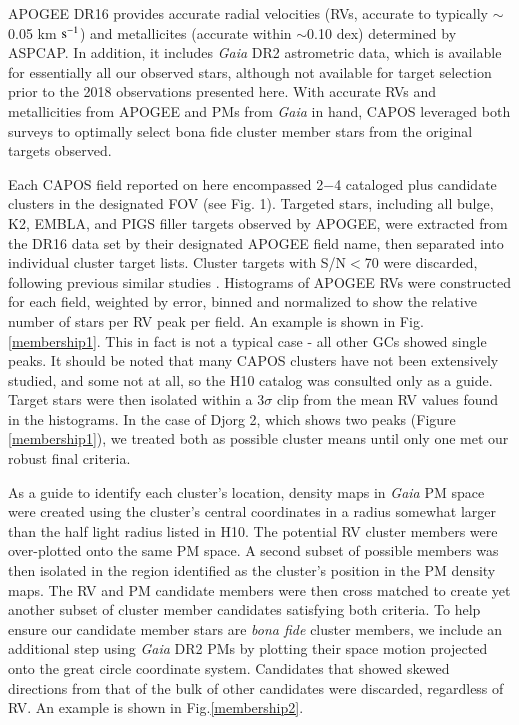 \documentclass[onecolumn]{aa}
\begin{document}
APOGEE DR16 provides accurate radial velocities (RVs, accurate to typically $\sim$0.05 km $\rm s^{-1}$) and metallicites (accurate within $\sim$0.10 dex) determined by ASPCAP.
In addition, it includes {\it Gaia} DR2 astrometric data, which is available for essentially all our observed stars, although not available for target selection prior to the 2018 observations presented here.
With accurate RVs and metallicities from APOGEE and PMs from {\it Gaia} in hand, CAPOS leveraged both surveys to optimally select bona fide cluster member stars from the original targets observed. 

Each CAPOS field reported on here encompassed 2$-$4 cataloged plus candidate clusters in the designated FOV (see Fig. 1).
Targeted stars, including all bulge, K2, EMBLA, and PIGS filler targets observed by APOGEE, were extracted from the DR16 data set by their designated APOGEE field name, then separated into individual cluster target lists.  
Cluster targets with S/N$<$70 were discarded, following previous similar studies \citep[e.g.,][]{Meszaros2020}.
Histograms of APOGEE RVs were constructed for each field, weighted by error, binned and normalized to show the relative number of stars per RV peak per field. An example is shown in 
Fig.\ref{membership1}. This in fact is not a typical case - all other GCs showed single peaks.
It should be noted that many CAPOS clusters have not been extensively studied, and some not at all, so the H10 catalog was consulted only as a guide. Target stars were then isolated within a 3$\sigma$ clip from the mean RV values found in the histograms. In the case of Djorg 2, which shows two peaks (Figure \ref{membership1}), we treated both as possible cluster means until only one met our robust final criteria.

As a guide to identify each cluster\rq{}s location, density maps in {\it Gaia} PM space were created using the cluster\rq{}s central coordinates in a radius somewhat larger than the half light radius listed in H10. 
The potential RV cluster members were over-plotted onto the same PM space. A second subset of possible members was then isolated in the region identified as the cluster\rq{}s position in the PM density maps. The RV and PM candidate members were then cross matched to create yet another subset of cluster member candidates satisfying both criteria.
To help ensure our candidate member stars are {\it bona fide} cluster members, we include an additional step using {\it Gaia} DR2 PMs by plotting their space motion projected onto the great circle coordinate system. 
Candidates that showed skewed directions from that of the bulk of other candidates were discarded, regardless of RV. An example is shown in Fig.\ref{membership2}.
\end{document}
